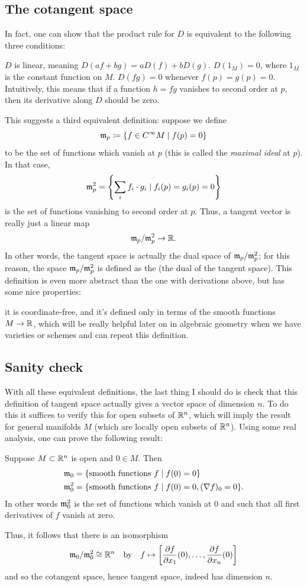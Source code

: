 \subsection{The cotangent space}
In fact, one can show that the product rule
for $D$ is equivalent to the following three conditions:
\begin{enumerate}
	\ii $D$ is linear, meaning $D(af+bg) = a D(f) + b D(g)$.
	\ii $D(1_M) = 0$, where $1_M$ is the constant function on $M$.
	\ii $D(fg) = 0$ whenever $f(p) = g(p) = 0$.
	Intuitively, this means that if a function $h = fg$
	vanishes to second order at $p$,
	then its derivative along $D$ should be zero.
\end{enumerate}

This suggests a third equivalent definition:
suppose we define
\[ \mathfrak m_p \coloneqq \left\{ f \in C^\infty M \mid f(p) = 0 \right\} \]
to be the set of functions which vanish at $p$
(this is called the \emph{maximal ideal} at $p$).
In that case,
\[ \mathfrak m_p^2 = \left\{ \sum_i f_i \cdot g_i
	\mid f_i(p) = g_i(p) = 0 \right\} \]
is the set of functions vanishing to second order at $p$.
Thus, a tangent vector is really just a linear map
\[ \mathfrak m_p / \mathfrak m_p^2 \to \mathbb R. \]
In other words, the tangent space is actually the
dual space of $\mathfrak m_p / \mathfrak m_p^2$;
for this reason, the space $\mathfrak m_p / \mathfrak m_p^2$ is defined as the
 (the dual of the tangent space).
This definition is even more abstract than the one with derivations above,
but has some nice properties:
\begin{itemize}
	\ii it is coordinate-free, and
	\ii it's defined only in terms of the smooth functions $M \to \mathbb R$,
	which will be really helpful later on in algebraic geometry
	when we have varieties or schemes and can repeat this definition.
\end{itemize}

\subsection{Sanity check}
With all these equivalent definitions, the last thing I should do is check that
this definition of tangent space actually gives a vector space of dimension $n$.
To do this it suffices to verify this for open subsets of $\mathbb R^n$,
which will imply the result for general manifolds $M$
(which are locally open subsets of $\mathbb R^n$).
Using some real analysis, one can prove the following result:
\begin{theorem}
	Suppose $M \subset \mathbb R^n$ is open and $0 \in M$.
	Then
	\[
	\begin{aligned}
		\mathfrak m_0 &= \{ \text{smooth functions } f \mid f(0) = 0 \} \\
		\mathfrak m_0^2 &= \{ \text{smooth functions } f \mid f(0) = 0, (\nabla f)_0 = 0 \}.
	\end{aligned}
	\]
	In other words $\mathfrak m_0^2$ is the set of functions which vanish at $0$
	and such that all first derivatives of $f$ vanish at zero.
\end{theorem}
Thus, it follows that there is an isomorphism
\[ \mathfrak m_0 / \mathfrak m_0^2 \cong \mathbb R^n
	\quad\text{by}\quad
	f \mapsto
	\left[ \frac{\partial f}{\partial x_1}(0),
		\dots, \frac{\partial f}{\partial x_n}(0) \right] \]
and so the cotangent space, hence tangent space,
indeed has dimension $n$.

